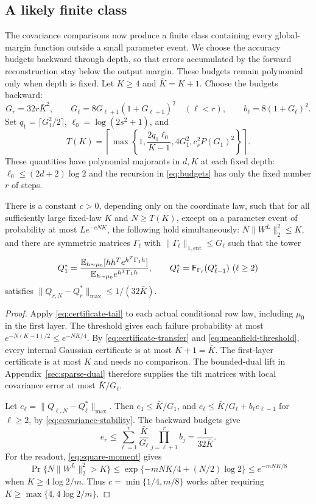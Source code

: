 \subsection{A likely finite class}
The covariance comparisons now produce a finite class containing every
global-margin function outside a small parameter event. We choose the
accuracy budgets backward through depth, so that errors accumulated by
the forward reconstruction stay below the output margin. These budgets
remain polynomial only when depth is fixed.
Let $K\geq4$ and $\bar K=K+1$. Choose the budgets backward:
\begin{equation}\label{eq:budgets}
 G_r=32r\bar K^2,\qquad
 G_\ell=8G_{\ell+1}(1+G_{\ell+1})^2\quad(\ell<r),
 \qquad b_\ell=8(1+G_\ell)^2.
\end{equation}
Set $q_1=\lceil G_1^2/2\rceil$, $\ell_0=\log(2s^2+1)$, and
\begin{equation}\label{eq:meanfield-threshold}
 T(K)=\left\lceil\max\left\{1,\frac{2q_1\ell_0}{K-1},
                    4G_1^2,c_\nu^2P(G_1)^2\right\}\right\rceil.
\end{equation}
These quantities have polynomial majorants in $d,K$ at each fixed depth:
$\ell_0\leq(2d+2)\log2$ and the recursion in \eqref{eq:budgets} has
only the fixed number $r$ of steps.

\begin{lemma}\label{lem:proxy}
There is a constant $c>0$, depending only on the coordinate law, such
that for all sufficiently large fixed-law $K$ and $N\geq T(K)$,
except on a parameter event of probability at most $Le^{-cNK}$, the
following hold simultaneously: $N\|W^L\|_2^2\leq K$, and there are
symmetric matrices $\Gamma_\ell$ with
$\|\Gamma_\ell\|_{1,\mathrm{ent}}\leq G_\ell$ such that the tower
\[
 Q_1^*=\frac{\E_{h\sim\mu_0}[hh^Te^{h^T\Gamma_1h}]}
                    {\E_{h\sim\mu_0}e^{h^T\Gamma_1h}},
 \qquad Q_\ell^*=\mathsf F_{\Gamma_\ell}(Q_{\ell-1}^*)\ (\ell\geq2)
\]
satisfies $\|Q_{r,N}-Q_r^*\|_{\max}\leq1/(32\bar K)$.
\end{lemma}
\begin{proof}
Apply \eqref{eq:certificate-tail} to each actual conditional row law,
including $\mu_0$ in the first layer. The threshold gives each failure
probability at most
$e^{-N(K-1)/2}\leq e^{-NK/4}$. By
\eqref{eq:certificate-transfer} and \eqref{eq:meanfield-threshold},
every internal Gaussian certificate is at most $K+1=\bar K$.
The first-layer certificate is at most $K$ and needs no comparison.
The bounded-dual lift in Appendix~\ref{sec:sparse-dual} therefore
supplies the tilt matrices with local covariance error at most
$\bar K/G_\ell$.

Let $e_\ell=\|Q_{\ell,N}-Q_\ell^*\|_{\max}$.
Then $e_1\leq\bar K/G_1$, and
$e_\ell\leq\bar K/G_\ell+b_\ell e_{\ell-1}$ for $\ell\geq2$,
by \eqref{eq:covariance-stability}. The backward budgets give
\[
 e_r\leq\sum_{\ell=1}^r\frac{\bar K}{G_\ell}
                  \prod_{j=\ell+1}^r b_j
       =\frac1{32\bar K}.
\]
For the readout, \eqref{eq:square-moment} gives
\[
 \Pr\{N\|W^L\|_2^2>K\}
 \leq\exp\{-mNK/4+(N/2)\log2\}\leq e^{-mNK/8}
\]
when $K\geq4\log2/m$. Thus $c=\min\{1/4,m/8\}$ works after
requiring $K\geq\max\{4,4\log2/m\}$.
\end{proof}

